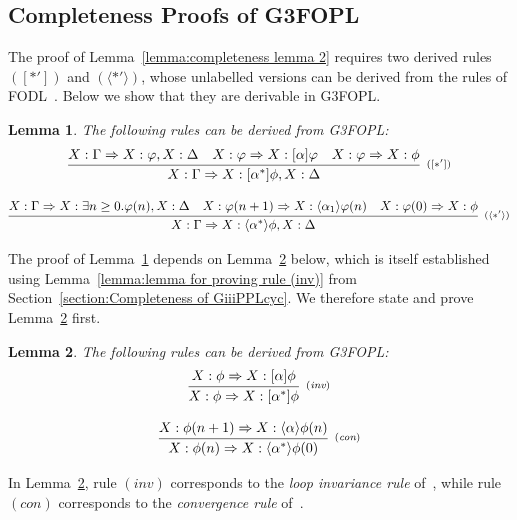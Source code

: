 \documentclass[manuscript,screen]{acmart}
\newtheorem{lemma}{Lemma}[section]
\newcommand{\la}[0]{\langle}
\newcommand{\ra}[0]{\rangle}
\newcommand{\lup}[0]{*}
\newcommand{\GiiiFOPLcyc}[0]{\mbox{G3FOPL}}
\newcommand{\FODL}[0]{\mbox{FODL}}
\begin{document}
\subsection{Completeness Proofs of \GiiiFOPLcyc}
\label{section:About the Completeness of GiiiFOPLcyc}

The proof of Lemma~\ref{lemma:completeness lemma 2} requires two derived rules $([\lup'])$ and $(\la\lup'\ra)$, whose unlabelled versions can be derived from the rules of \FODL~\cite{Harel00}.
Below we show that they are derivable in \GiiiFOPLcyc. 

\begin{lemma}
    \label{lemma:derived rules related to loops}
The following rules can be derived from \GiiiFOPLcyc: 
$$
\infer[^{([\lup'])}]
{X : \Gamma\Rightarrow X : [\alpha^\lup]\phi, X : \Delta}
{X : \Gamma\Rightarrow X : \varphi, X : \Delta
&
X : \varphi\Rightarrow X : [\alpha]\varphi
&
X : \varphi\Rightarrow X : \phi
}
$$

$$
\infer[^{(\la\lup'\ra)}]
{X : \Gamma\Rightarrow X : \la\alpha^\lup\ra\phi, X : \Delta}
{X : \Gamma\Rightarrow X : \exists n\ge 0. \varphi(n), X : \Delta
&
X : \varphi(n+1)\Rightarrow X : \la\alpha_1\ra\varphi(n)
&
X : \varphi(0)\Rightarrow X : \phi
}
$$
\end{lemma}

The proof of Lemma~\ref{lemma:derived rules related to loops} depends on Lemma~\ref{lemma:inv and con rules} below, which is itself established using Lemma~\ref{lemma:lemma for proving rule (inv)} from Section~\ref{section:Completeness of GiiiPPLcyc}.  We therefore state and prove Lemma~\ref{lemma:inv and con rules} first. 



\begin{lemma}
\label{lemma:inv and con rules}
The following rules can be derived from \GiiiFOPLcyc:
$$
\infer[^{(\textit{inv})}]
{X : \phi\Rightarrow X : [\alpha^\lup]\phi}
{X : \phi\Rightarrow X : [\alpha]\phi}
$$

$$
\infer[^{(\textit{con})}]
{X : \phi(n)\Rightarrow X : \la\alpha^\lup\ra\phi(0)}
{X : \phi(n+1)\Rightarrow X : \la\alpha\ra\phi(n)}
$$
\end{lemma}

In Lemma~\ref{lemma:inv and con rules}, rule $(\textit{inv})$ corresponds to the \emph{loop invariance rule} of~\cite{Harel00}, while rule $(\textit{con})$ corresponds to the \emph{convergence rule} of~\cite{Harel00}. 
\end{document}
